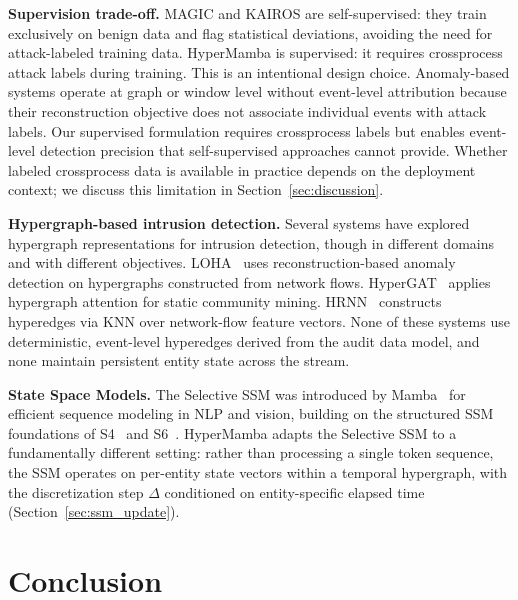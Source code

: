 \documentclass[letterpaper,twocolumn,10pt]{article}
\begin{document}
\textbf{Supervision trade-off.} MAGIC and KAIROS are self-supervised: they train exclusively on benign data and flag statistical deviations, avoiding the need for attack-labeled training data. HyperMamba is supervised: it requires crossprocess attack labels during training. This is an intentional design choice. Anomaly-based systems operate at graph or window level without event-level attribution because their reconstruction objective does not associate individual events with attack labels. Our supervised formulation requires crossprocess labels but enables event-level detection precision that self-supervised approaches cannot provide. Whether labeled crossprocess data is available in practice depends on the deployment context; we discuss this limitation in Section~\ref{sec:discussion}.

\textbf{Hypergraph-based intrusion detection.} Several systems have explored hypergraph representations for intrusion detection, though in different domains and with different objectives. LOHA~\cite{chen2025loha} uses reconstruction-based anomaly detection on hypergraphs constructed from network flows. HyperGAT~\cite{ding-etal-2020-less} applies hypergraph attention for static community mining. HRNN~\cite{yang2024hrnn} constructs hyperedges via KNN over network-flow feature vectors. None of these systems use deterministic, event-level hyperedges derived from the audit data model, and none maintain persistent entity state across the stream.

\textbf{State Space Models.} The Selective SSM was introduced by Mamba~\cite{gu2024mamba} for efficient sequence modeling in NLP and vision, building on the structured SSM foundations of S4~\cite{gu2022efficiently} and S6~\cite{gu2024mamba}. HyperMamba adapts the Selective SSM to a fundamentally different setting: rather than processing a single token sequence, the SSM operates on per-entity state vectors within a temporal hypergraph, with the discretization step $\Delta$ conditioned on entity-specific elapsed time (Section~\ref{sec:ssm_update}).

\section{Conclusion}
\label{sec:conclusion}
\end{document}
